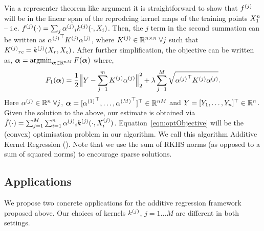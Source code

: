 Via a representer theorem like argument it is straightforward to show
that $f^{(j)}$ will be in the linear span of the reprodcing kernel maps of the
training points $X_1^{n}$ -- i.e. $f^{(j)}(\cdot) = 
\sum_j {\alpha^{(j)}}_i k^{(j)}(\cdot, X_i) $.
Then, the $j$ term in the second summation can be written as
${{\alpha^{(j)}}}^\top {K^{(j)}} {\alpha^{(j)}}$,
where ${K^{(j)}} \in \mathbb{R}^{n\times n}\; \forall
j$ such that ${K^{(j)}}_{rc} = k^{(j)}(X_r, X_c)$.
After further simplification, the objective can be written as,
${\bm{\alpha}} = \mathop{\mathrm{argmin}}_{{\bm{\alpha}} \in \mathbb{R}^{nM}} F({\bm{\alpha}})$ where,
\begin{equation}
F_1({\bm{\alpha}}) = \frac{1}{2}\Big\|Y - \sum_{j=1}^m {K^{(j)}} {\alpha^{(j)}}\Big\|_2^2 + 
  \lambda \sum_{j=1}^M \sqrt{{{\alpha^{(j)}}}^\top {K^{(j)}} {\alpha^{(j)}}}.
\label{eqn:optObjective}
\end{equation}
Here ${\alpha^{(j)}} \in \mathbb{R}^n \; \forall j$, ${\bm{\alpha}} = [{\alpha^{(1)}}^\top, \dots, 
{\alpha^{(M)}}^\top]^\top  \in\mathbb{R}^{nM}$ and $Y = [Y_1, \dots, Y_n]^\top \in
\mathbb{R}^n$. Given the solution to the above, our
estimate is obtained via $\hat{f}(\cdot) = \sum_{j=1}^M \sum_{i=1}^n {\alpha^{(j)}}_i
k^{(j)}(\cdot, X^{(j)}_i)$.
Equation~\eqref{eqn:optObjective} will be the (convex) optimisation problem in our
algorithm.
We call this algorithm Additive Kernel Regression (\addkrr).
Note that we use the sum of RKHS norms (as opposed to a sum of squared norms) to
encourage sparse solutions.


\subsection{Applications}

We propose two concrete applications for the additive regression framework
proposed above. Our choices of kernels $k^{(j)}$, $j=1\dots M$ are different
in both settings.

